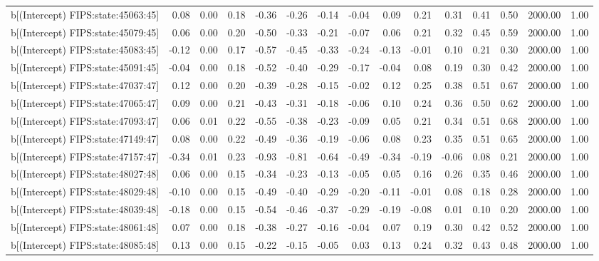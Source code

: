\begin{table}[ht]
\begin{tabular}{rrrrrrrrrrrrrrr}
  b[(Intercept) FIPS:state:45063:45] & 0.08 & 0.00 & 0.18 & -0.36 & -0.26 & -0.14 & -0.04 & 0.09 & 0.21 & 0.31 & 0.41 & 0.50 & 2000.00 & 1.00 \\ 
  b[(Intercept) FIPS:state:45079:45] & 0.06 & 0.00 & 0.20 & -0.50 & -0.33 & -0.21 & -0.07 & 0.06 & 0.21 & 0.32 & 0.45 & 0.59 & 2000.00 & 1.00 \\ 
  b[(Intercept) FIPS:state:45083:45] & -0.12 & 0.00 & 0.17 & -0.57 & -0.45 & -0.33 & -0.24 & -0.13 & -0.01 & 0.10 & 0.21 & 0.30 & 2000.00 & 1.00 \\ 
  b[(Intercept) FIPS:state:45091:45] & -0.04 & 0.00 & 0.18 & -0.52 & -0.40 & -0.29 & -0.17 & -0.04 & 0.08 & 0.19 & 0.30 & 0.42 & 2000.00 & 1.00 \\ 
  b[(Intercept) FIPS:state:47037:47] & 0.12 & 0.00 & 0.20 & -0.39 & -0.28 & -0.15 & -0.02 & 0.12 & 0.25 & 0.38 & 0.51 & 0.67 & 2000.00 & 1.00 \\ 
  b[(Intercept) FIPS:state:47065:47] & 0.09 & 0.00 & 0.21 & -0.43 & -0.31 & -0.18 & -0.06 & 0.10 & 0.24 & 0.36 & 0.50 & 0.62 & 2000.00 & 1.00 \\ 
  b[(Intercept) FIPS:state:47093:47] & 0.06 & 0.01 & 0.22 & -0.55 & -0.38 & -0.23 & -0.09 & 0.05 & 0.21 & 0.34 & 0.51 & 0.68 & 2000.00 & 1.00 \\ 
  b[(Intercept) FIPS:state:47149:47] & 0.08 & 0.00 & 0.22 & -0.49 & -0.36 & -0.19 & -0.06 & 0.08 & 0.23 & 0.35 & 0.51 & 0.65 & 2000.00 & 1.00 \\ 
  b[(Intercept) FIPS:state:47157:47] & -0.34 & 0.01 & 0.23 & -0.93 & -0.81 & -0.64 & -0.49 & -0.34 & -0.19 & -0.06 & 0.08 & 0.21 & 2000.00 & 1.00 \\ 
  b[(Intercept) FIPS:state:48027:48] & 0.06 & 0.00 & 0.15 & -0.34 & -0.23 & -0.13 & -0.05 & 0.05 & 0.16 & 0.26 & 0.35 & 0.46 & 2000.00 & 1.00 \\ 
  b[(Intercept) FIPS:state:48029:48] & -0.10 & 0.00 & 0.15 & -0.49 & -0.40 & -0.29 & -0.20 & -0.11 & -0.01 & 0.08 & 0.18 & 0.28 & 2000.00 & 1.00 \\ 
  b[(Intercept) FIPS:state:48039:48] & -0.18 & 0.00 & 0.15 & -0.54 & -0.46 & -0.37 & -0.29 & -0.19 & -0.08 & 0.01 & 0.10 & 0.20 & 2000.00 & 1.00 \\ 
  b[(Intercept) FIPS:state:48061:48] & 0.07 & 0.00 & 0.18 & -0.38 & -0.27 & -0.16 & -0.04 & 0.07 & 0.19 & 0.30 & 0.42 & 0.52 & 2000.00 & 1.00 \\ 
  b[(Intercept) FIPS:state:48085:48] & 0.13 & 0.00 & 0.15 & -0.22 & -0.15 & -0.05 & 0.03 & 0.13 & 0.24 & 0.32 & 0.43 & 0.48 & 2000.00 & 1.00 \\ 

\end{tabular}
\end{table}
